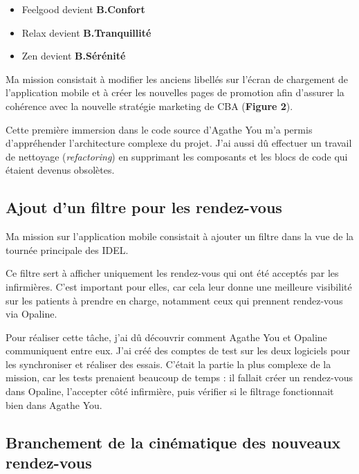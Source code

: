 \documentclass{article}
\begin{document}
\begin{itemize}
    \item Feelgood devient \textbf{B.Confort}
    \item Relax devient \textbf{B.Tranquillité}
    \item Zen devient \textbf{B.Sérénité}
\end{itemize}

Ma mission consistait à modifier les anciens libellés sur l'écran de chargement de l'application mobile et à créer les nouvelles pages de promotion afin d'assurer la cohérence avec la nouvelle stratégie marketing de CBA (\textbf{Figure 2}).

Cette première immersion dans le code source d'Agathe You m'a permis d'appréhender l'architecture complexe du projet. J'ai aussi dû effectuer un travail de nettoyage (\textit{refactoring}) en supprimant les composants et les blocs de code qui étaient devenus obsolètes.


\newpage

\subsection{Ajout d'un filtre pour les rendez-vous}

Ma mission sur l'application mobile consistait à ajouter un filtre dans la vue de la tournée principale des IDEL.

Ce filtre sert à afficher uniquement les rendez-vous qui ont été acceptés par les infirmières. C'est important pour elles, car cela leur donne une meilleure visibilité sur les patients à prendre en charge, notamment ceux qui prennent rendez-vous via Opaline.

Pour réaliser cette tâche, j'ai dû découvrir comment Agathe You et Opaline communiquent entre eux. J'ai créé des comptes de test sur les deux logiciels pour les synchroniser et réaliser des essais. C'était la partie la plus complexe de la mission, car les tests prenaient beaucoup de temps : il fallait créer un rendez-vous dans Opaline, l'accepter côté infirmière, puis vérifier si le filtrage fonctionnait bien dans Agathe You.

\subsection{Branchement de la cinématique des nouveaux rendez-vous}
\end{document}
